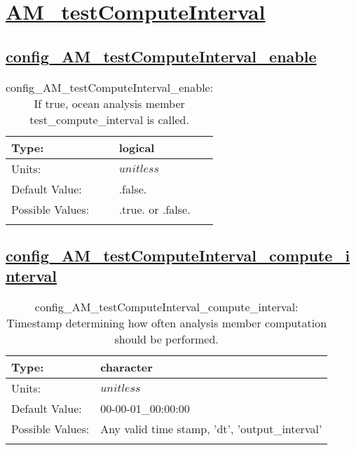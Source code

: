 \section[AM\_testComputeInterval]{\hyperref[sec:nm_tab_AM_testComputeInterval]{AM\_testComputeInterval}}
\label{sec:nm_sec_AM_testComputeInterval}
\subsection[config\_AM\_testComputeInterval\_enable]{\hyperref[sec:nm_tab_AM_testComputeInterval]{config\_AM\_testComputeInterval\_enable}}
\label{subsec:nm_sec_config_AM_testComputeInterval_enable}
\begin{center}
\begin{longtable}{| p{2.0in} || p{4.0in} |}
    \hline
    Type: & logical \\
    \hline
    Units: & $unitless$ \\
    \hline
    Default Value: & .false. \\
    \hline
    Possible Values: & .true. or .false. \\
    \hline
    \caption{config\_AM\_testComputeInterval\_enable: If true, ocean analysis member test\_compute\_interval is called.}
\end{longtable}
\end{center}
\subsection[config\_AM\_testComputeInterval\_compute\_interval]{\hyperref[sec:nm_tab_AM_testComputeInterval]{config\_AM\_testComputeInterval\_compute\_interval}}
\label{subsec:nm_sec_config_AM_testComputeInterval_compute_interval}
\begin{center}
\begin{longtable}{| p{2.0in} || p{4.0in} |}
    \hline
    Type: & character \\
    \hline
    Units: & $unitless$ \\
    \hline
    Default Value: & 00-00-01\_00:00:00 \\
    \hline
    Possible Values: & Any valid time stamp, 'dt', 'output\_interval' \\
    \hline
    \caption{config\_AM\_testComputeInterval\_compute\_interval: Timestamp determining how often analysis member computation should be performed.}
\end{longtable}
\end{center}
